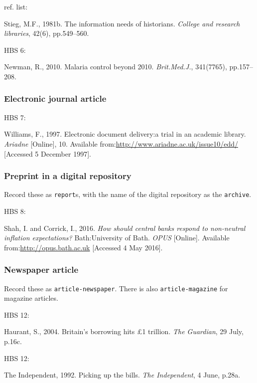 ref. list: \cite{stieg1981inh}

Stieg, M.F., 1981b. The information needs of historians. \emph{College and research libraries}, 42(6), pp.549--560.


HBS 6: \cite{newman2010mcb}

Newman, R., 2010. Malaria control beyond 2010. \emph{Brit.\@ Med.\@ J.}, 341(7765), pp.157--208.



\subsubsection*{Electronic journal article}

HBS 7: \cite{williams1997edd}

Williams, F., 1997. Electronic document delivery:\@ a trial in an academic library. \emph{Ariadne} [Online], 10. Available from:\@ \url{http://www.ariadne.ac.uk/issue10/edd/} [Accessed 5 December 1997].



\subsubsection*{Preprint in a digital repository}

Record these as \texttt{report}s, with the name of the digital repository as the \texttt{archive}.

HBS 8: \cite{shah.corrick2016hsc}

Shah, I. and Corrick, I., 2016. \emph{How should central banks respond to non-neutral inflation expectations?} Bath:\@ University of Bath. \emph{OPUS} [Online]. Available from:\@ \url{http://opus.bath.ac.uk} [Accessed 4 May 2016].



\subsubsection*{Newspaper article}

Record these as \texttt{article-newspaper}. There is also \texttt{article-magazine} for magazine articles.

HBS 12: \cite{haurant2004bbh}

Haurant, S., 2004. Britain's borrowing hits £1 trillion. \emph{The Guardian}, 29 July, p.16c.


HBS 12: \cite{independent1992pub}

The Independent, 1992. Picking up the bills. \emph{The Independent}, 4 June, p.28a.



